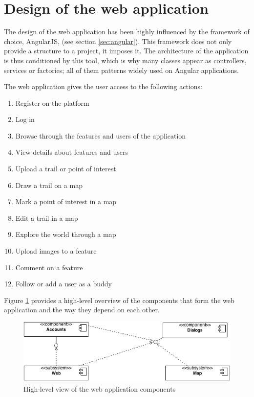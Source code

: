 \FloatBarrier
\section{Design of the web application}\label{sec:webappdesign}

The design of the web application has been highly influenced by the framework of choice, AngularJS, (see section \ref{sec:angular}). This framework does not only provide a structure to a project, it imposes it. The architecture of the application is thus conditioned by this tool, which is why many classes appear as controllers, services or factories; all of them patterns widely used on Angular applications.

The web application gives the user access to the following actions:

\begin{enumerate}
\item Register on the platform
\item Log in
\item Browse through the features and users of the application
\item View details about features and users
\item Upload a trail or point of interest
\item Draw a trail on a map
\item Mark a point of interest in a map
\item Edit a trail in a map
\item Explore the world through a map
\item Upload images to a feature
\item Comment on a feature
\item Follow or add a user as a buddy
\end{enumerate}

Figure \ref{fig:webapp-components} provides a high-level overview of the components that form the web application and the way they depend on each other. 

\begin{figure}[ht]
  \centering
  \includegraphics[width=.8\textwidth]{fig/webapp-components}
  \caption{High-level view of the web application components}
  \label{fig:webapp-components}
\end{figure} 

